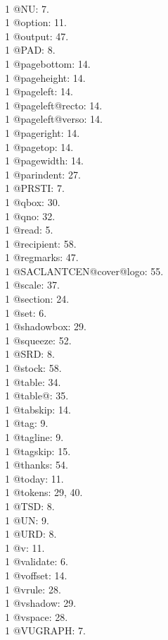 \\1 @NU: 7.
\\1 @option: 11.
\\1 @output: 47.
\\1 @PAD: 8.
\\1 @pagebottom: 14.
\\1 @pageheight: 14.
\\1 @pageleft: 14.
\\1 @pageleft@recto: 14.
\\1 @pageleft@verso: 14.
\\1 @pageright: 14.
\\1 @pagetop: 14.
\\1 @pagewidth: 14.
\\1 @parindent: 27.
\\1 @PRSTI: 7.
\\1 @qbox: 30.
\\1 @qno: 32.
\\1 @read: 5.
\\1 @recipient: 58.
\\1 @regmarks: 47.
\\1 @SACLANTCEN@cover@logo: 55.
\\1 @scale: 37.
\\1 @section: 24.
\\1 @set: 6.
\\1 @shadowbox: 29.
\\1 @squeeze: 52.
\\1 @SRD: 8.
\\1 @stock: 58.
\\1 @table: 34.
\\1 @table@: 35.
\\1 @tabskip: 14.
\\1 @tag: 9.
\\1 @tagline: 9.
\\1 @tagskip: 15.
\\1 @thanks: 54.
\\1 @today: 11.
\\1 @tokens: 29, 40.
\\1 @TSD: 8.
\\1 @UN: 9.
\\1 @URD: 8.
\\1 @v: 11.
\\1 @validate: 6.
\\1 @voffset: 14.
\\1 @vrule: 28.
\\1 @vshadow: 29.
\\1 @vspace: 28.
\\1 @VUGRAPH: 7.
